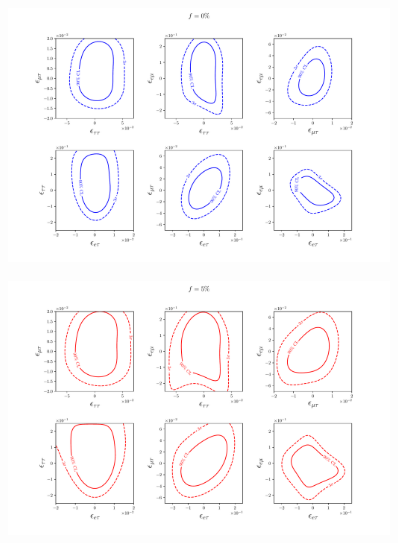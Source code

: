 \documentclass[draft=True]{revtex4-2}
\begin{document}
{{%


\begin{figure}
   \includegraphics[width=0.9\textwidth]{figures/PINGU_2D_all_f0.pdf}
\end{figure}
\begin{figure}
   \includegraphics[width=0.9\textwidth]{figures/PINGU_2D_all_f5.pdf}
\end{figure}



}}
\end{document}
